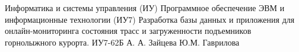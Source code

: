 \documentclass{bmstu}
\begin{document}
\makecourseworktitle
{Информатика и системы управления (ИУ)}
{Программное обеспечение ЭВМ и информационные технологии (ИУ7)}
{Разработка базы данных и приложения для онлайн-мониторинга состояния трасс и загруженности подъемников горнолыжного курорта.}
{ИУ7-62Б}
{А. А. Зайцева}
{Ю.М. Гаврилова}{}{}

\setcounter{page}{3}


%

\maketableofcontents

%













\end{document}
